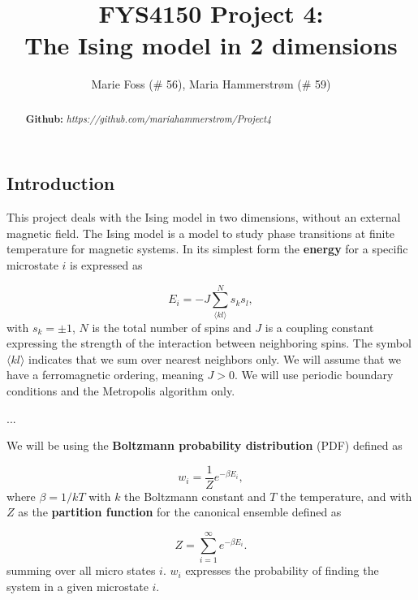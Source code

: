 \documentclass{article}
\title{\textbf{FYS4150 Project 4: \\The Ising model in 2 dimensions}}
\author{Marie Foss (\# 56), Maria Hammerstr{{\o}}m (\# 59)}
\date{} %
\begin{document}
\maketitle

\begin{abstract}
	\noindent \lipsum[1]
	\vspace*{2ex}
	
	\noindent \textbf{Github:} \textit{https://github.com/mariahammerstrom/Project4}
	\vspace*{2ex}
\end{abstract}



\begin{multicols}{2}

\section{Introduction}

This project deals with the Ising model in two dimensions, without an external magnetic field. The Ising model is a model to study phase transitions at finite temperature for magnetic systems. In its simplest form the \textbf{energy} for a specific microstate $i$ is expressed as

\begin{equation}\label{eq:energy}
	E_i = -J \sum_{\langle kl\rangle}^{N}s_k s_l,
\end{equation}
with  $s_k=\pm 1$, $N$ is the total number of spins and $J$ is a coupling constant expressing the strength of the interaction between neighboring spins. The symbol $\langle kl\rangle$ indicates that we sum over nearest neighbors only. We will assume that we have a ferromagnetic ordering, meaning $J> 0$. We will use periodic boundary conditions and the Metropolis algorithm only. 

...

We will be using the \textbf{Boltzmann probability distribution} (PDF) defined as

\begin{equation}\label{eq:distribution}
	w_i = \frac{1}{Z} e^{- \beta E_i},
\end{equation}
where $\beta = 1/kT$ with $k$ the Boltzmann constant and $T$ the temperature, and with $Z$ as the \textbf{partition function} for the canonical ensemble defined as

\begin{equation}\label{eq:partition_func}
	Z = \sum_{i = 1}^{\infty} e^{-\beta E_i}.
\end{equation}
summing over all micro states $i$. $w_i$ expresses the probability of finding the system in a given microstate $i$.


\end{multicols}
\end{document}

